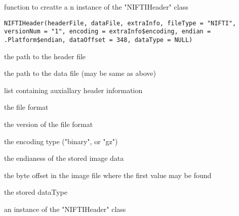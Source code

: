 \begin{Description}\relax
function to creatte a n instance of the "NIFTIHeader" class
\end{Description}
\begin{Usage}
\begin{verbatim}
NIFTIHeader(headerFile, dataFile, extraInfo, fileType = "NIFTI", versionNum = "1", encoding = extraInfo$encoding, endian = .Platform$endian, dataOffset = 348, dataType = NULL)
\end{verbatim}
\end{Usage}
\begin{Arguments}
\begin{ldescription}
\item[\code{headerFile}] the path to the header file 
\item[\code{dataFile}] the path to the data file (may be same as above) 
\item[\code{extraInfo}] list containing auxiallary header information  
\item[\code{fileType}] the file format 
\item[\code{versionNum}] the version of the file format 
\item[\code{encoding}] the encoding type ("binary", or "gz") 
\item[\code{endian}] the endianess of the stored image data 
\item[\code{dataOffset}] the byte offset in the image file where the first value
may be found 
\item[\code{dataType}] the stored dataType 
\end{ldescription}
\end{Arguments}
\begin{Value}
an instance of the "NIFTIHeader" class
\end{Value}

